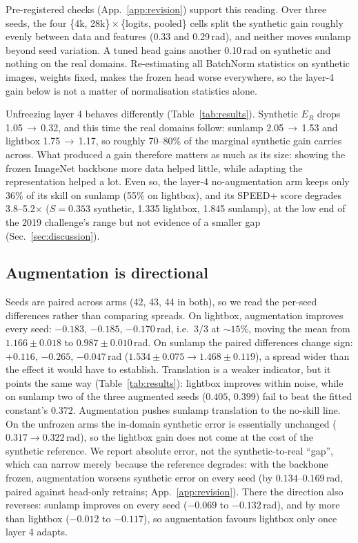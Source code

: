 \documentclass{article}
\newcommand{\Erot}{E_{R}}
\begin{document}
Pre-registered checks (App.~\ref{app:revision}) support this reading. Over three
seeds, the four \{4k, 28k\}\,$\times$\,\{logits, pooled\} cells split the synthetic
gain roughly evenly between data and features (0.33 and 0.29\,rad), and neither moves
sunlamp beyond seed variation. A tuned head gains another 0.10\,rad on synthetic and
nothing on the real domains. Re-estimating all BatchNorm statistics on synthetic images,
weights fixed, makes the frozen head worse everywhere, so the layer-4 gain below is not a
matter of normalisation statistics alone.

Unfreezing layer 4 behaves differently (Table~\ref{tab:results}). Synthetic $\Erot$ drops
1.05\,$\to$\,0.32, and this time the real domains follow: sunlamp 2.05\,$\to$\,1.53 and
lightbox 1.75\,$\to$\,1.17, so roughly 70--80\% of the marginal synthetic gain carries
across. What produced a gain therefore matters as much as its size: showing the frozen
ImageNet backbone more data helped little, while adapting the representation helped a
lot. Even so, the layer-4 no-augmentation arm keeps only 36\% of its skill on sunlamp (55\% on lightbox),
and its SPEED+ score degrades 3.8--5.2$\times$ ($S{=}0.353$ synthetic, 1.335 lightbox,
1.845 sunlamp), at the low end of the 2019 challenge's range but not evidence of a
smaller gap (Sec.~\ref{sec:discussion}).


\subsection{Augmentation is directional}
\label{sec:directional}

Seeds are paired across arms (42, 43, 44 in both), so we read the per-seed
differences rather than comparing spreads. On lightbox, augmentation improves
every seed: $-0.183$, $-0.185$, $-0.170$\,rad, i.e.\ 3/3 at ${\sim}15\%$, moving
the mean from $1.166 \pm 0.018$ to $0.987 \pm 0.010$\,rad. On sunlamp the paired
differences change sign: $+0.116$, $-0.265$, $-0.047$\,rad
($1.534 \pm 0.075 \to 1.468 \pm 0.119$), a spread wider than the effect it would
have to establish. Translation is a weaker indicator, but it points the same way
(Table~\ref{tab:results}): lightbox improves within noise, while on sunlamp two of the
three augmented seeds ($0.405$, $0.399$) fail to beat the fitted constant's $0.372$.
Augmentation pushes sunlamp translation to the no-skill line. On the unfrozen arms the
in-domain synthetic error is essentially unchanged ($0.317 \to 0.322$\,rad), so the
lightbox gain does not come at the cost of the synthetic reference. We report absolute
error, not the synthetic-to-real ``gap'', which can narrow merely because the reference
degrades: with the backbone frozen, augmentation worsens synthetic error on every seed
(by $0.134$--$0.169$\,rad, paired against head-only retrains; App.~\ref{app:revision}).
There the direction also reverses: sunlamp improves on every seed ($-0.069$ to
$-0.132$\,rad), and by more than lightbox ($-0.012$ to $-0.117$), so augmentation
favours lightbox only once layer 4 adapts.
\end{document}
